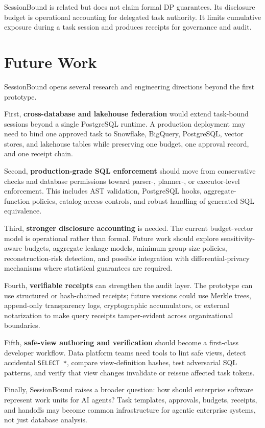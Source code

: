 \documentclass[
]{article}
\begin{document}
SessionBound is related but does not claim formal DP guarantees. Its
disclosure budget is operational accounting for delegated task
authority. It limits cumulative exposure during a task session and
produces receipts for governance and audit.


\hypertarget{future-work}{%
\section{Future Work}\label{future-work}}

SessionBound opens several research and engineering directions beyond
the first prototype.

First, \textbf{cross-database and lakehouse federation} would extend
task-bound sessions beyond a single PostgreSQL runtime. A production
deployment may need to bind one approved task to Snowflake, BigQuery,
PostgreSQL, vector stores, and lakehouse tables while preserving one
budget, one approval record, and one receipt chain.

Second, \textbf{production-grade SQL enforcement} should move from
conservative checks and database permissions toward parser-, planner-,
or executor-level enforcement. This includes AST validation, PostgreSQL
hooks, aggregate-function policies, catalog-access controls, and robust
handling of generated SQL equivalence.

Third, \textbf{stronger disclosure accounting} is needed. The current
budget-vector model is operational rather than formal. Future work
should explore sensitivity-aware budgets, aggregate leakage models,
minimum group-size policies, reconstruction-risk detection, and possible
integration with differential-privacy mechanisms where statistical
guarantees are required.

Fourth, \textbf{verifiable receipts} can strengthen the audit layer. The
prototype can use structured or hash-chained receipts; future versions
could use Merkle trees, append-only transparency logs, cryptographic
accumulators, or external notarization to make query receipts
tamper-evident across organizational boundaries.

Fifth, \textbf{safe-view authoring and verification} should become a
first-class developer workflow. Data platform teams need tools to lint
safe views, detect accidental \texttt{SELECT\ *}, compare
view-definition hashes, test adversarial SQL patterns, and verify that
view changes invalidate or reissue affected task tokens.

Finally, SessionBound raises a broader question: how should enterprise
software represent work units for AI agents? Task templates, approvals,
budgets, receipts, and handoffs may become common infrastructure for
agentic enterprise systems, not just database analysis.
\end{document}

